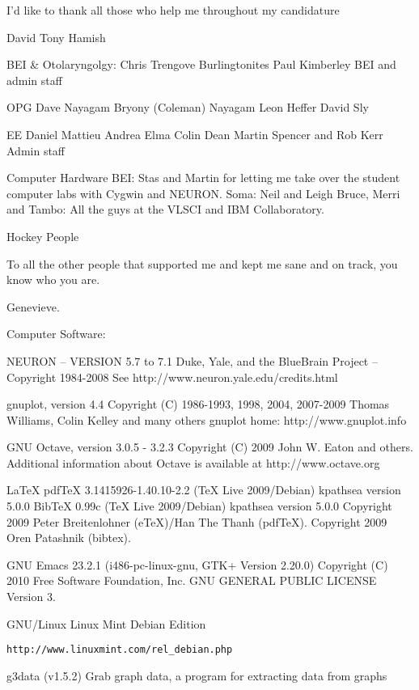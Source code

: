 
\begin{acknowledgements}

	I'd like to thank all those who help me throughout my candidature

David
Tony
Hamish

BEI \& Otolaryngolgy: Chris Trengove
Burlingtonites
Paul
Kimberley
BEI and admin staff

OPG
Dave Nayagam
Bryony (Coleman) Nayagam 
Leon Heffer
David Sly

EE
Daniel
Mattieu
Andrea
Elma
Colin
Dean
Martin Spencer and Rob Kerr
Admin staff

Computer Hardware
BEI: Stas and Martin for letting me take over the student computer labs with Cygwin and NEURON\@.
Soma: Neil and Leigh
Bruce, Merri and Tambo: All the guys at the VLSCI and IBM Collaboratory.


Hockey People

To all the other people that supported me and kept me sane and on track, you know who you are.

Genevieve.





Computer Software:

NEURON -- VERSION 5.7 to 7.1
Duke, Yale, and the BlueBrain Project -- Copyright 1984-2008
See {http://www.neuron.yale.edu/credits.html}

gnuplot, version 4.4 
Copyright (C) 1986-1993, 1998, 2004, 2007-2009
Thomas Williams, Colin Kelley and many others
gnuplot home:     http://www.gnuplot.info

GNU Octave, version 3.0.5 - 3.2.3
Copyright (C) 2009 John W. Eaton and others.
Additional information about Octave is available at
{http://www.octave.org}

LaTeX 
pdfTeX 3.1415926-1.40.10-2.2 (TeX Live 2009/Debian)
kpathsea version 5.0.0
BibTeX 0.99c (TeX Live 2009/Debian)
kpathsea version 5.0.0
Copyright 2009 Peter Breitenlohner (eTeX)/Han The Thanh (pdfTeX).
Copyright 2009 Oren Patashnik (bibtex).

GNU Emacs 23.2.1 (i486-pc-linux-gnu, GTK+ Version 2.20.0)
Copyright (C) 2010 Free Software Foundation, Inc.
GNU GENERAL PUBLIC LICENSE Version 3.


GNU/Linux
Linux Mint Debian Edition
\begin{verbatim}
http://www.linuxmint.com/rel_debian.php
\end{verbatim}

g3data (v1.5.2)  
Grab graph data, a program for extracting data from graphs


\end{acknowledgements}
